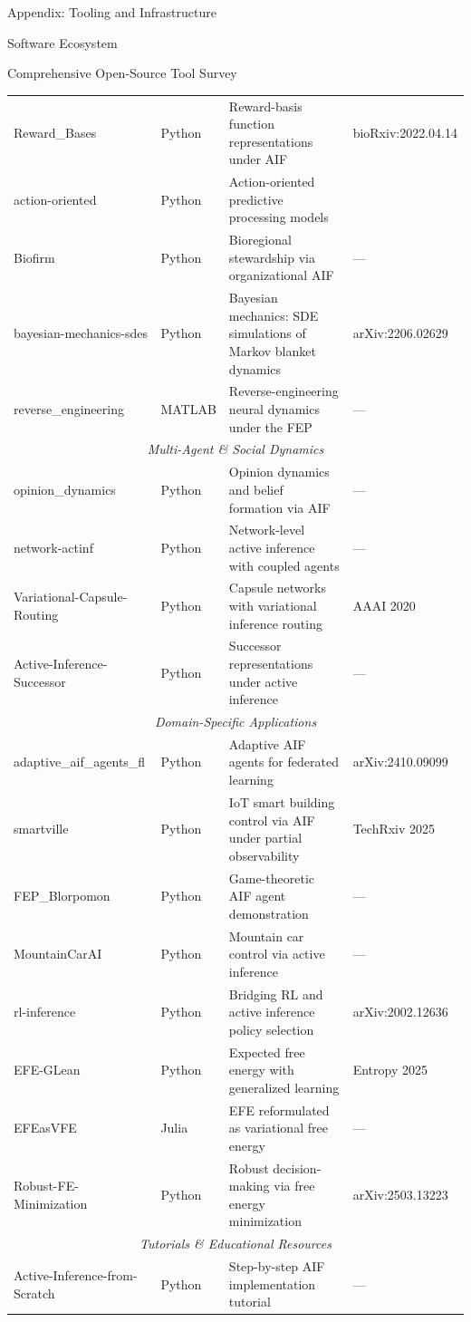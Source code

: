 \documentclass[
  ignorenonframetext,
]{beamer}
\begin{document}
\begin{frame}[fragile]{Appendix: Tooling and Infrastructure
\label{sec:tooling}}
\begin{block}{Software Ecosystem}
\begin{block}{Comprehensive Open-Source Tool Survey}
\begin{center}
\begin{longtable}{p{3.2cm} p{1.6cm} p{4.4cm} p{2.5cm}}
Reward\_Bases & Python & Reward-basis function representations under AIF & bioRxiv:2022.04.14 \\
action-oriented & Python & Action-oriented predictive processing models & \cite{tschantz2020action} \\
Biofirm & Python & Bioregional stewardship via organizational AIF & — \\
bayesian-mechanics-sdes & Python & Bayesian mechanics: SDE simulations of Markov blanket dynamics & arXiv:2206.02629 \\
reverse\_engineering & MATLAB & Reverse-engineering neural dynamics under the FEP & — \\
\hline
\multicolumn{4}{c}{\textit{Multi-Agent \& Social Dynamics}} \\
\hline
opinion\_dynamics & Python & Opinion dynamics and belief formation via AIF & — \\
network-actinf & Python & Network-level active inference with coupled agents & — \\
Variational-Capsule-Routing & Python & Capsule networks with variational inference routing & AAAI 2020 \\
Active-Inference-Successor & Python & Successor representations under active inference & — \\
\hline
\multicolumn{4}{c}{\textit{Domain-Specific Applications}} \\
\hline
adaptive\_aif\_agents\_fl & Python & Adaptive AIF agents for federated learning & arXiv:2410.09099 \\
smartville & Python & IoT smart building control via AIF under partial observability & TechRxiv 2025 \\
FEP\_Blorpomon & Python & Game-theoretic AIF agent demonstration & — \\
MountainCarAI & Python & Mountain car control via active inference & — \\
rl-inference & Python & Bridging RL and active inference policy selection & arXiv:2002.12636 \\
EFE-GLean & Python & Expected free energy with generalized learning & Entropy 2025 \\
EFEasVFE & Julia & EFE reformulated as variational free energy & — \\
Robust-FE-Minimization & Python & Robust decision-making via free energy minimization & arXiv:2503.13223 \\
\hline
\multicolumn{4}{c}{\textit{Tutorials \& Educational Resources}} \\
\hline
Active-Inference-from-Scratch & Python & Step-by-step AIF implementation tutorial & — \\

\end{longtable}
\end{center}
\end{block}
\end{block}
\end{frame}
\end{document}
